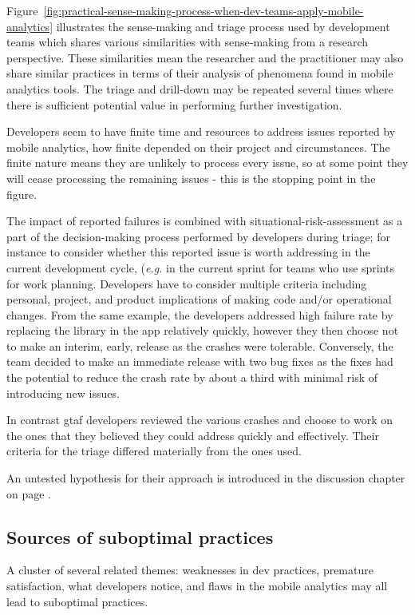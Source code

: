 Figure~\ref{fig:practical-sense-making-process-when-dev-teams-apply-mobile-analytics} illustrates the sense-making and triage process used by development teams which shares various similarities with sense-making from a research perspective. These similarities mean the researcher and the practitioner may also share similar practices in terms of their analysis of phenomena found in mobile analytics tools. The triage and drill-down may be repeated several times where there is sufficient potential value in performing further investigation.

Developers seem to have finite time and resources to address issues reported by mobile analytics, how finite depended on their project and circumstances. The finite nature means they are unlikely to process every issue, so at some point they will cease processing the remaining issues - this is the stopping point in the figure.

The impact of reported failures is combined with situational-risk-assessment as a part of the decision-making process performed by developers during triage; for instance to consider whether this reported issue is worth addressing in the current development cycle, (\emph{e.g.} in the current sprint for teams who use sprints for work planning. Developers have to consider multiple criteria including personal, project, and product implications of making code and/or operational changes. From the same  example, the developers addressed high failure rate by replacing the  library in the app relatively quickly, however they then choose not to make an interim, early, release as the crashes were tolerable. Conversely, the  team decided to make an immediate release with two bug fixes as the fixes had the potential to reduce the crash rate by about a third with minimal risk of introducing new issues. 

In contrast \Gls{gtaf} developers reviewed the various crashes and choose to work on the ones that they believed they could address quickly and effectively. Their criteria for the triage differed materially from the ones  used.

An untested hypothesis for their approach is introduced in the discussion chapter on page \pageref{discussion-decision-making-by-dev-teams-section}.

\subsection{Sources of suboptimal practices}
A cluster of several related themes: weaknesses in dev practices, premature satisfaction, what developers notice, and flaws in the mobile analytics may all lead to suboptimal practices.

